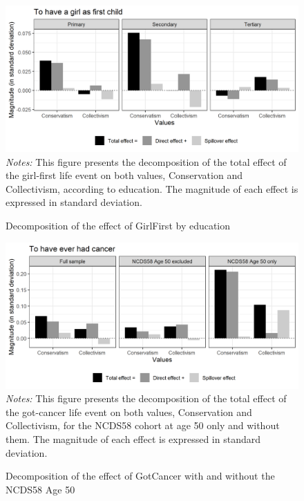 \begin{figure}[!htb]
    \centering
    \caption{Decomposition of the effect of GirlFirst by education}
    \label{chap3-fig:sem-decomp-v5-GFEduc}
    \includegraphics[width=\linewidth]{chap3/graphic/decomp-v5-GFEduc.png}
    \hrulefill
	\vspace{-3em}
	\justify\singlespacing\footnotesize{\textit{Notes:} This figure presents the decomposition of the total effect of the girl-first life event on both values, Conservation and Collectivism, according to education. The magnitude of each effect is expressed in standard deviation.}
\end{figure}

\begin{figure}[!htb]
    \centering
    \caption{Decomposition of the effect of GotCancer with and without the NCDS58 Age 50}
    \label{chap3-fig:sem-decomp-v5-GCNCDS58}
    \includegraphics[width=\linewidth]{chap3/graphic/decomp-v5-GCNCDS58.png}
    \hrulefill
	\vspace{-3em}
	\justify\singlespacing\footnotesize{\textit{Notes:} This figure presents the decomposition of the total effect of the got-cancer life event on both values, Conservation and Collectivism, for the NCDS58 cohort at age 50 only and without them. The magnitude of each effect is expressed in standard deviation.}
\end{figure}

